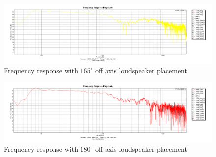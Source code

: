 \documentclass{article}
\begin{document}
\begin{figure}[htbp]
\begin{center}
\includegraphics[width=15cm,keepaspectratio=true]{Figures/TaskBFR165deg}
\caption{Frequency response with $165^\circ$ off axis loudspeaker placement}
\label{fig:TaskBFR165deg}
\end{center}
\end{figure}
\begin{figure}[htbp]
\begin{center}
\includegraphics[width=15cm,keepaspectratio=true]{Figures/TaskBFR180deg}
\caption{Frequency response with $180^\circ$ off axis loudspeaker placement}
\label{fig:TaskBFR180deg}
\end{center}
\end{figure}
\end{document}
